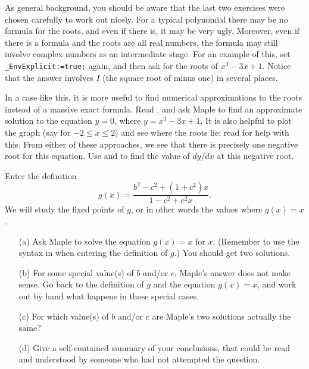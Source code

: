 \documentclass[a4paper,10pt]{amsbook}
\numberwithin{example}{chapter}
\begin{document}
\begin{exercise}\label{ex-cubic-horrid}
 As general background, you should be aware that the last two
 exercises were chosen carefully to work out nicely.  For a typical
 polynomial there may be no formula for the roots, and even if there
 is, it may be very ugly.  Moreover, even if there is a formula and
 the roots are all real numbers, the formula may still involve complex
 numbers as an intermediate stage.  For an example of this, set
 \verb~_EnvExplicit:=true;~ again, and then ask for the roots of
 $x^3-3x+1$.  Notice that the answer involves $I$ (the square root of
 minus one) in several places.

 In a case like this, it is more useful to find numerical
 approximations to the roots instead of a massive exact
 formula.  Read \note{\NOTEfsolve}, and ask Maple to find an
 approximate solution to the equation $y=0$, where $y=x^3-3x+1$.
 It is also helpful to plot the graph (say for $-2\leq x\leq 2$) and
 see where the roots lie: read \note{\NOTEbasicplot} for help with
 this.  From either of these approaches, we see that there is
 precisely one negative root for this equation.  Use \note{\NOTEdiff}
 and \note{\NOTEsubs} to find the value of $dy/dx$ at this negative
 root. 
\end{exercise}

\begin{exercise}\label{ex-mobius-fix}
 Enter the definition
 \[ g(x) = \frac{b^2-c^2+(1+c^2)x}{1-c^2+ c^2x}. \]
 We will study the fixed points of $g$, or in other words the values
 where $g(x)=x$.  
 \begin{itemize}
  \item[(a)] Ask Maple to solve the equation $g(x)=x$ for
   $x$.  (Remember to use the syntax in \note{\NOTEarrow}
   when entering the definition of $g$.)  You should get two
   solutions. 
  \item[(b)] For some special value(s) of $b$ and/or $c$, Maple's
   answer does not make sense.  Go back to the definition of $g$ and
   the equation $g(x)=x$, and work out by hand what happens in those
   special cases.
  \item[(c)] For which value(s) of $b$ and/or $c$ are Maple's two
   solutions actually the same?
  \item[(d)] Give a self-contained summary of your conclusions, that
   could be read and understood by someone who had not attempted the
   question. 
 \end{itemize}
\end{exercise}
\end{document}
